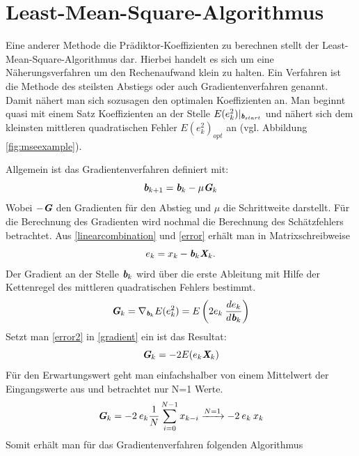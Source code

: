 \documentclass[
    10pt, %
    DIV12,
    english, %
    a5paper, %
    twoside, %
    titlepage, %
    parskip=half, %
    headings=small, %
    listof=totoc, %
    bibliography=totoc, %
    index=totoc, %
    captions=tableheading, %
    final %
]{scrbook}
\begin{document}
\section{Least-Mean-Square-Algorithmus}\label{sec:gradientenverfahren}
Eine anderer Methode die Prädiktor-Koeffizienten zu berechnen stellt der Least-Mean-Square-Algorithmus dar. Hierbei handelt es sich um eine Näherungsverfahren um den Rechenaufwand klein zu halten. Ein Verfahren ist die Methode des steilsten Abstiegs oder auch Gradientenverfahren genannt. Damit nähert man sich sozusagen den optimalen Koeffizienten an. Man beginnt quasi mit einem Satz Koeffizienten an der Stelle $E(e_k^2)|_{\textit{\textbf{b}}_{start}}$  und nähert sich dem kleinsten mittleren quadratischen Fehler $E(e_k^2)_{opt}$ an (vgl. Abbildung \ref{fig:mseexample}). 

\noindent
Allgemein ist das Gradientenverfahren definiert mit:
\begin{equation}\label{gradmethod}
\textit{\textbf{b}}_{k+1}=\textit{\textbf{b}}_k-\mu\textit{\textbf{G}}_k
\end{equation}
Wobei $-\textit{\textbf{G}}$ den Gradienten für den Abstieg und $\mu$ die Schrittweite darstellt. Für die Berechnung des Gradienten wird nochmal die Berechnung des Schätzfehlers betrachtet.
Aus \eqref{linearcombination} und \eqref{error} erhält man in Matrixschreibweise
\begin{equation}\label{error2}
e_k=x_k-\textit{\textbf{b}}_k\textit{\textbf{X}}_k.
\end{equation}
Der Gradient an der Stelle $\textit{\textbf{b}}_k$ wird über die erste Ableitung mit Hilfe der Kettenregel des mittleren quadratischen Fehlers bestimmt.
\begin{equation}\label{gradient}
\textit{\textbf{G}}_k=\nabla_{\textit{\textbf{b}}_k}E(e_k^2)=E\left(2e_k\:\frac{de_k}{d\textit{\textbf{b}}_k}\right)
\end{equation}
Setzt man \eqref{error2} in \eqref{gradient} ein ist das Resultat:
\begin{equation}
\textit{\textbf{G}}_k=-2E(e_k{\textit{\textbf{X}}_k})\nonumber
\end{equation}
Für den Erwartungswert geht man einfachshalber von einem Mittelwert der Eingangswerte aus und betrachtet nur N=1 Werte.
\begin{equation}
\textit{\textbf{G}}_k=-2\:e_k\frac{1}{N}\sum_{i=0}^{N-1}x_{k-i}\xrightarrow{N=1}-2\:e_k\:x_k\nonumber
\end{equation}
Somit erhält man für das Gradientenverfahren folgenden Algorithmus
\end{document}
